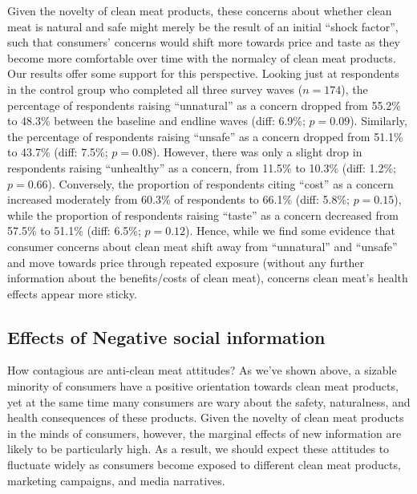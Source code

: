 \documentclass[12pt]{article}
\begin{document}
Given the novelty of clean meat products, these concerns about whether clean meat is natural and safe might merely be the result of an initial ``shock factor'', such that consumers' concerns would shift more towards price and taste as they become more comfortable over time with the normalcy of clean meat products. Our results offer some support for this perspective. Looking just at respondents in the control group who completed all three survey waves ($n=174$), the percentage of respondents raising ``unnatural'' as a concern dropped from 55.2\% to 48.3\% between the baseline and endline waves (diff: 6.9\%; $p = 0.09$). Similarly, the percentage of respondents raising ``unsafe'' as a concern dropped from 51.1\% to 43.7\% (diff: 7.5\%; $p = 0.08$). However, there was only a slight drop in respondents raising ``unhealthy'' as a concern, from 11.5\% to 10.3\% (diff: 1.2\%; $p = 0.66$). Conversely, the proportion of respondents citing ``cost'' as a concern increased moderately from 60.3\% of respondents to 66.1\% (diff: 5.8\%; $p = 0.15$), while the proportion of respondents raising ``taste'' as a concern decreased from 57.5\% to 51.1\% (diff: 6.5\%; $p = 0.12$). Hence, while we find some evidence that consumer concerns about clean meat shift away from ``unnatural'' and ``unsafe'' and move towards price through repeated exposure (without any further information about the benefits/costs of clean meat), concerns clean meat's health effects appear more sticky.



\subsection{Effects of Negative social information}

How contagious are anti-clean meat attitudes? As we've shown above, a sizable minority of consumers have a positive orientation towards clean meat products, yet at the same time many consumers are wary about the safety, naturalness, and health consequences of these products. Given the novelty of clean meat products in the minds of consumers, however, the marginal effects of new information are likely to be particularly high. As a result, we should expect these attitudes to fluctuate widely as consumers become exposed to different clean meat products, marketing campaigns, and media narratives.
\end{document}
